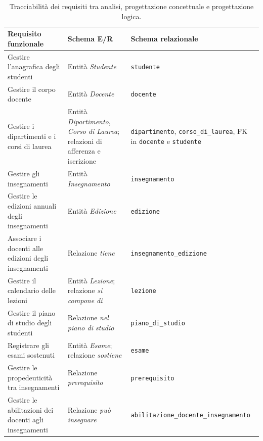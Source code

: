 \begin{table}[htbp]
\centering
\small
\renewcommand{\arraystretch}{1.5}
\begin{tabular}{>{\raggedright\arraybackslash}p{5.5cm} >{\raggedright\arraybackslash}p{4.2cm} >{\raggedright\arraybackslash}p{4.5cm}}
\hline
\textbf{Requisito funzionale} & \textbf{Schema E/R} & \textbf{Schema relazionale} \\
\hline

Gestire l'anagrafica degli studenti &
Entità \emph{Studente} &
\texttt{studente} \\

Gestire il corpo docente &
Entità \emph{Docente} &
\texttt{docente} \\

Gestire i dipartimenti e i corsi di laurea &
Entità \emph{Dipartimento}, \emph{Corso di Laurea}; relazioni di afferenza e iscrizione &
\texttt{dipartimento}, \texttt{corso\_di\_laurea}, FK in \texttt{docente} e \texttt{studente} \\

Gestire gli insegnamenti &
Entità \emph{Insegnamento} &
\texttt{insegnamento} \\

Gestire le edizioni annuali degli insegnamenti &
Entità \emph{Edizione} &
\texttt{edizione} \\

Associare i docenti alle edizioni degli insegnamenti &
Relazione \emph{tiene} &
\texttt{insegnamento\_edizione} \\

Gestire il calendario delle lezioni &
Entità \emph{Lezione}; relazione \emph{si compone di} &
\texttt{lezione} \\

Gestire il piano di studio degli studenti &
Relazione \emph{nel piano di studio} &
\texttt{piano\_di\_studio} \\

Registrare gli esami sostenuti &
Entità \emph{Esame}; relazione \emph{sostiene} &
\texttt{esame} \\

Gestire le propedeuticità tra insegnamenti &
Relazione \emph{prerequisito} &
\texttt{prerequisito} \\

Gestire le abilitazioni dei docenti agli insegnamenti &
Relazione \emph{può insegnare} &
\texttt{abilitazione\_\allowbreak docente\_\allowbreak insegnamento} \\
\hline

\end{tabular}
\caption{Tracciabilità dei requisiti tra analisi, progettazione concettuale e progettazione logica.}
\label{tab:tracciabilita}
\end{table}